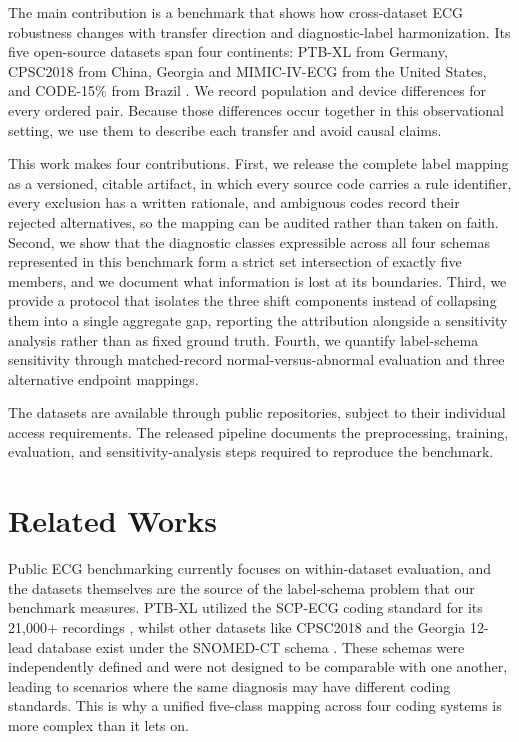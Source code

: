\documentclass[conference]{IEEEtran}
\begin{document}
The main contribution is a benchmark that shows how cross-dataset ECG robustness changes with transfer direction and diagnostic-label harmonization. Its five open-source datasets span four continents: PTB-XL from Germany, CPSC2018 from China, Georgia and MIMIC-IV-ECG from the United States, and CODE-15\% from Brazil \cite{wagner2020,alday2020,gow2023,code15}. We record population and device differences for every ordered pair. Because those differences occur together in this observational setting, we use them to describe each transfer and avoid causal claims.

This work makes four contributions. First, we release the complete label mapping as a versioned, citable artifact, in which every source code carries a rule identifier, every exclusion has a written rationale, and ambiguous codes record their rejected alternatives, so the mapping can be audited rather than taken on faith. Second, we show that the diagnostic classes expressible across all four schemas represented in this benchmark form a strict set intersection of exactly five members, and we document what information is lost at its boundaries. Third, we provide a protocol that isolates the three shift components instead of collapsing them into a single aggregate gap, reporting the attribution alongside a sensitivity analysis rather than as fixed ground truth. Fourth, we quantify label-schema sensitivity through matched-record normal-versus-abnormal evaluation and three alternative endpoint mappings.

The datasets are available through public repositories, subject to their individual access requirements. The released pipeline documents the preprocessing, training, evaluation, and sensitivity-analysis steps required to reproduce the benchmark.

\section{Related Works}

Public ECG benchmarking currently focuses on within-dataset evaluation, and the datasets themselves are the source of the label-schema problem that our benchmark measures. PTB-XL utilized the SCP-ECG coding standard for its 21,000+ recordings \cite{wagner2020}, whilst other datasets like CPSC2018 and the Georgia 12-lead database exist under the SNOMED-CT schema \cite{alday2020}. These schemas were independently defined and were not designed to be comparable with one another, leading to scenarios where the same diagnosis may have different coding standards. This is why a unified five-class mapping across four coding systems is more complex than it lets on.
\end{document}
